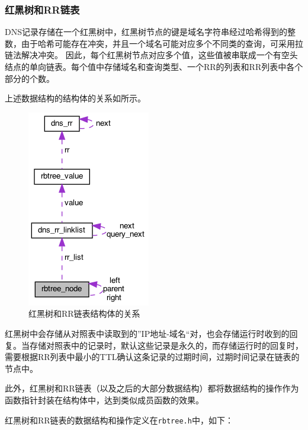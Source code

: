 \documentclass[lang=cn,11pt,a4paper,cite=authornum]{paper}
\begin{document}
\subsubsection{红黑树和RR链表}

DNS记录存储在一个红黑树中，红黑树节点的键是域名字符串经过哈希得到的整数，由于哈希可能存在冲突，并且一个域名可能对应多个不同类的查询，可采用拉链法解决冲突。
因此，每个红黑树节点对应多个值，这些值被串联成一个有空头结点的单向链表。每个值中存储域名和查询类型、一个RR的列表和RR列表中各个部分的个数。

上述数据结构的结构体的关系如所示。

\begin{figure}[htbp]

    \centering
    \includegraphics[width=0.3\linewidth]{./APIdoc/structrbtree__node__coll__graph.png}
    \caption{红黑树和RR链表结构体的关系\label{fig:rbtree_structure}}

\end{figure}

红黑树中会存储从对照表中读取到的”IP地址-域名“对，也会存储运行时收到的回复。当存储对照表中的记录时，默认这些记录是永久的，而存储运行时的回复时，需要根据RR列表中最小的TTL确认这条记录的过期时间，过期时间记录在链表的节点中。

此外，红黑树和RR链表（以及之后的大部分数据结构）都将数据结构的操作作为函数指针封装在结构体中，达到类似成员函数的效果。

红黑树和RR链表的数据结构和操作定义在\texttt{rbtree.h}中，如下：
\end{document}

